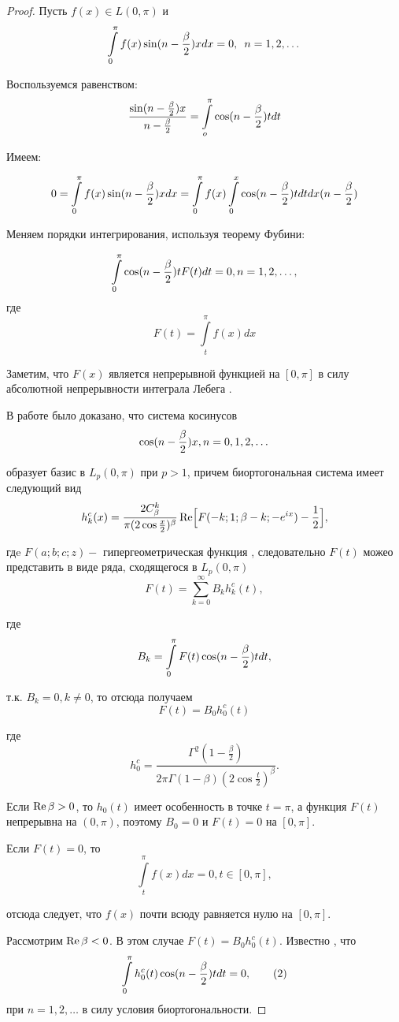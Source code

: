﻿\documentclass[oneside, final, 14pt]{extreport}
\begin{document}
	
	\begin{proof}
		Пусть $f(x) \in L(0, \pi)$ и $$\int\limits_0^{\pi}f(x)\sin(n - \frac{\beta}{2})xdx = 0, \enspace n = 1, 2, \dots$$
		
		Воспользуемся равенством:
		$$
			\frac{\sin(n - \frac{\beta}{2})x}{n - \frac{\beta}{2}} = \int\limits_o^\pi\cos(n - \frac{\beta}{2})tdt
		$$
		
		Имеем:
		
		$$
			 0 = \int\limits_0^\pi f(x)\sin(n - \frac{\beta}{2})xdx = \int\limits_0^\pi f(x) \int\limits_0^x\cos(n - \frac{\beta}{2})tdtdx(n - \frac{\beta}{2})
		$$
		
		Меняем порядки интегрирования, используя теорему Фубини:
	
		$$
			\int\limits_0^\pi\cos(n - \frac{\beta}{2})tF(t)dt = 0, n = 1, 2, \dots,
		$$
		где
		$$
			F(t) = \int\limits_t^\pi f(x) dx
		$$
		
		Заметим, что $F(x)$ является непрерывной функцией на $[0, \pi]$ в силу абсолютной непрерывности 
		интеграла Лебега \cite{kolmogorov}.
		
		В работе \cite{moiseev-dan} было доказано, что система косинусов
		$$
			\cos(n - \frac{\beta}{2})x, n = 0, 1, 2, \dots
		$$
		
		образует базис в $L_p(0, \pi)$ при $p > 1$, причем биортогональная система имеет следующий вид
		$$
			h^c_k(x) = \frac{2C^k_\beta}{\pi(2\cos\frac{x}{2})^\beta}
			\operatorname{Re}\Bigl[F(-k; 1; \beta - k; -e^{ix}) - \frac{1}{2}\Bigr],
		$$
		
		гдe $F(a; b; c; z) - $ гипергеометрическая функция \cite{bateman}, следовательно $F(t)$ можео представить
		в виде ряда, сходящегося в $L_p(0, \pi)$
		$$
			F(t) = \sum\limits^\infty_{k = 0}B_k h^c_k(t), 
		$$
		
		где 
		$$
			B_k = \int\limits_0^\pi F(t) \cos(n - \frac{\beta}{2})tdt,
		$$
		
		т.к. $B_k = 0, k \neq 0$, то отсюда получаем 
		$$
			F(t) = B_0 h^c_0(t)
		$$
		
		где 
		$$
			h^c_0 = \frac{\Gamma^2(1 - \frac{\beta}{2})}{2\pi \Gamma(1- \beta)(2\cos\frac{t}{2})^\beta}.
		$$
		
		Если $\operatorname{Re}\beta > 0$, то $h_0(t)$ имеет особенность в точке $t = \pi$, а функция $F(t)$ непрерывна на $(0, \pi)$,
		поэтому $B_0 = 0$ и $F(t) = 0$ на $[0, \pi]$.
		
		Если $F(t) = 0$, то 
		$$
			\int\limits_t^\pi f(x)dx = 0, t \in [0, \pi],
		$$
		
		отсюда следует, что $f(x)$ почти всюду равняется нулю на $[0, \pi]$.
		
		Рассмотрим $\operatorname{Re}\beta < 0$. В этом случае $F(t) = B_0h^c_0(t)$. Известно \cite{moiseev-dan}, что
		\begin{equation}
			\int\limits_0^\pi h^c_0(t)\cos(n - \frac{\beta}{2})tdt = 0, \tag{2} \label{eq:2}
		\end{equation}
		при $n = 1, 2, \ldots$ в силу условия биортогональности.
		

\end{proof}
\end{document}
